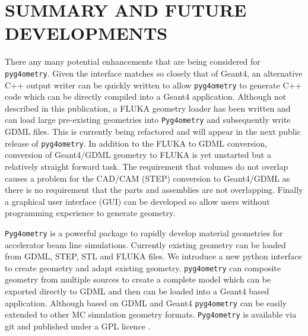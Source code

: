 \documentclass[a4paper,
               keeplastbox,   %
               ]{jacow}
\begin{document}
\section{SUMMARY AND FUTURE DEVELOPMENTS}
There any many potential enhancements that are being considered for \verb|pyg4ometry|. Given the interface matches so closely that of Geant4, 
an alternative C++ output writer can be quickly written to allow \verb|pyg4ometry| to generate C++ code which can be directly compiled into a 
Geant4 application. Although not described in this publication, a FLUKA geometry loader has been written and can load large pre-existing geometries into 
\verb|Pyg4ometry| and subsequently write GDML files. This is currently being refactored and will appear in the next public release of \verb|pyg4ometry|.
In addition to the FLUKA to GDML conversion, conversion of Geant4/GDML geometry to FLUKA is yet unstarted but a relatively straight forward
task. The requirement that volumes do not overlap causes a problem for the CAD/CAM (STEP) conversion to Geant4/GDML as there is no requirement 
that the parts and assemblies are not overlapping. Finally a graphical user interface (GUI) can be developed so allow users without programming 
experience to generate geometry.

\verb|Pyg4ometry| is a powerful package to rapidly develop material geometries for accelerator beam line simulations. Currently existing geometry can
be loaded from GDML, STEP, STL and FLUKA files. We introduce a new python interface to create geometry and adapt existing geometry. \verb|pyg4ometry| 
can composite geometry from multiple sources to create a complete model which can be exported directly to GDML and then can be loaded into a Geant4 
based application. Although based on GDML and Geant4 \verb|pyg4ometry| can be easily extended to other MC simulation geometry formats. \verb|Pyg4ometry| is 
available via git and published under a GPL licence \cite{pyg4omtery-git}.   

%
%
\end{document}
